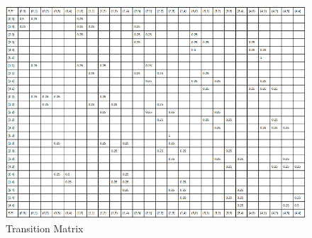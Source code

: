 \documentclass[11pt]{article}
\begin{document}
\begin{figure}[h]
\includegraphics[scale=0.5]{transition_matrix}
\centering
\caption{Transition Matrix}
\end{figure}
\end{document}
